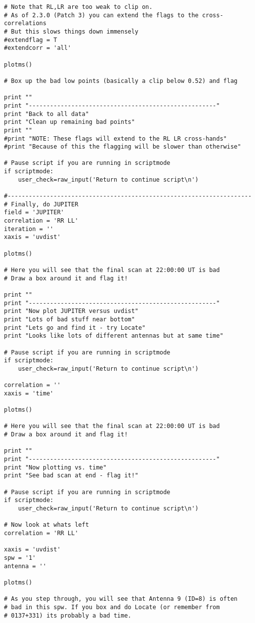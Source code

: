 \begin{verbatim}
# Note that RL,LR are too weak to clip on.
# As of 2.3.0 (Patch 3) you can extend the flags to the cross-correlations
# But this slows things down immensely
#extendflag = T
#extendcorr = 'all'

plotms()

# Box up the bad low points (basically a clip below 0.52) and flag

print ""
print "-----------------------------------------------------"
print "Back to all data"
print "Clean up remaining bad points"
print ""
#print "NOTE: These flags will extend to the RL LR cross-hands"
#print "Because of this the flagging will be slower than otherwise"

# Pause script if you are running in scriptmode
if scriptmode:
    user_check=raw_input('Return to continue script\n')

#---------------------------------------------------------------------
# Finally, do JUPITER
field = 'JUPITER'
correlation = 'RR LL'
iteration = ''
xaxis = 'uvdist'

plotms()

# Here you will see that the final scan at 22:00:00 UT is bad
# Draw a box around it and flag it!

print ""
print "-----------------------------------------------------"
print "Now plot JUPITER versus uvdist"
print "Lots of bad stuff near bottom"
print "Lets go and find it - try Locate"
print "Looks like lots of different antennas but at same time"

# Pause script if you are running in scriptmode
if scriptmode:
    user_check=raw_input('Return to continue script\n')

correlation = ''
xaxis = 'time'

plotms()

# Here you will see that the final scan at 22:00:00 UT is bad
# Draw a box around it and flag it!

print ""
print "-----------------------------------------------------"
print "Now plotting vs. time"
print "See bad scan at end - flag it!"

# Pause script if you are running in scriptmode
if scriptmode:
    user_check=raw_input('Return to continue script\n')

# Now look at whats left
correlation = 'RR LL'

xaxis = 'uvdist'
spw = '1'
antenna = ''

plotms()

# As you step through, you will see that Antenna 9 (ID=8) is often 
# bad in this spw. If you box and do Locate (or remember from
# 0137+331) its probably a bad time.


\end{verbatim}
